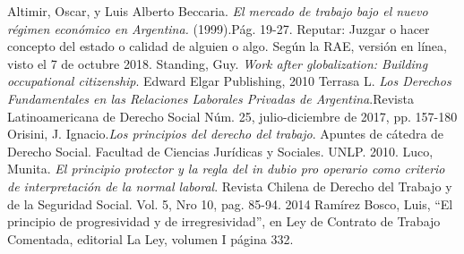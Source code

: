 \documentclass[a4paper]{article}
\begin{document}
\begin{thebibliography}{9}
Altimir, Oscar, y Luis Alberto Beccaria. \emph{El mercado de trabajo bajo el nuevo régimen económico en Argentina.} (1999).Pág. 19-27.
Reputar: Juzgar o hacer concepto del estado o calidad de alguien o algo. Según la RAE, versión en línea, visto el 7 de octubre 2018.
Standing, Guy. \emph{Work after globalization: Building occupational citizenship}. Edward Elgar Publishing, 2010
Terrasa L. \emph{Los Derechos Fundamentales en las Relaciones Laborales Privadas de Argentina}.Revista Latinoamericana de Derecho Social Núm. 25, julio-diciembre de 2017, pp. 157-180
Orisini, J. Ignacio.\emph{Los principios del derecho del trabajo}. Apuntes de cátedra de Derecho  Social. Facultad  de 
Ciencias Jurídicas y Sociales. UNLP. 2010.
 Luco, Munita. \emph{El principio protector y la regla del in dubio pro operario como criterio de interpretación de la normal laboral}. Revista Chilena de Derecho del Trabajo y de la Seguridad Social. Vol. 5, Nro 10, pag. 85-94. 2014
   Ramírez Bosco, Luis, “El principio de progresividad y de irregresividad”, en Ley de Contrato de Trabajo Comentada, editorial La Ley, volumen I página 332.
\end{thebibliography}
\end{document}
